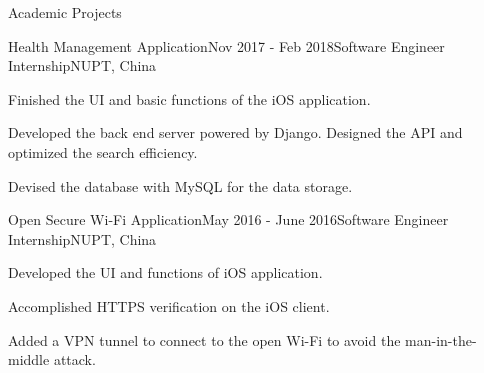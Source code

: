 \documentclass{resume} %
\begin{document}
\begin{rSection}{Academic Projects}

\begin{rSubsection}{Health Management Application}{Nov 2017 - Feb 2018}{Software Engineer Internship}{NUPT, China}
\item Finished the UI and basic functions of the iOS application. 
\item Developed the back end server powered by Django. Designed the API and optimized the search efficiency.
\item Devised the database with MySQL for the data storage.
\end{rSubsection}

\begin{rSubsection}{Open Secure Wi-Fi Application}{May 2016 - June 2016}{Software Engineer Internship}{NUPT, China}

\item Developed the UI and functions of iOS application.
\item Accomplished HTTPS verification on the iOS client.
\item Added a VPN tunnel to connect to the open Wi-Fi to avoid the man-in-the-middle attack.

\end{rSubsection}

\end{rSection}



\end{document}
